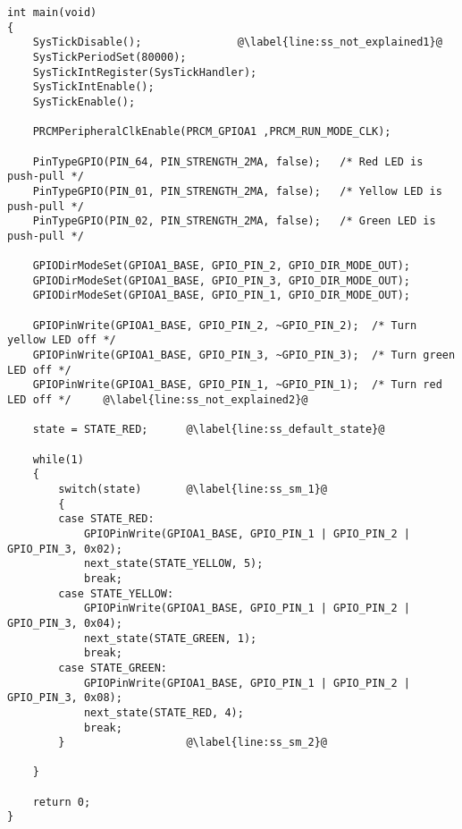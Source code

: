 \begin{lstlisting}[style=CStyle, caption={Second part of the static scheduler}, captionpos=b, label={lst:static_scheduler_2}, escapechar=@]
int main(void)
{
    SysTickDisable();               @\label{line:ss_not_explained1}@
    SysTickPeriodSet(80000);
    SysTickIntRegister(SysTickHandler);
    SysTickIntEnable();
    SysTickEnable();

    PRCMPeripheralClkEnable(PRCM_GPIOA1 ,PRCM_RUN_MODE_CLK);

    PinTypeGPIO(PIN_64, PIN_STRENGTH_2MA, false);   /* Red LED is push-pull */
    PinTypeGPIO(PIN_01, PIN_STRENGTH_2MA, false);   /* Yellow LED is push-pull */
    PinTypeGPIO(PIN_02, PIN_STRENGTH_2MA, false);   /* Green LED is push-pull */

    GPIODirModeSet(GPIOA1_BASE, GPIO_PIN_2, GPIO_DIR_MODE_OUT);
    GPIODirModeSet(GPIOA1_BASE, GPIO_PIN_3, GPIO_DIR_MODE_OUT);
    GPIODirModeSet(GPIOA1_BASE, GPIO_PIN_1, GPIO_DIR_MODE_OUT);

    GPIOPinWrite(GPIOA1_BASE, GPIO_PIN_2, ~GPIO_PIN_2);  /* Turn yellow LED off */
    GPIOPinWrite(GPIOA1_BASE, GPIO_PIN_3, ~GPIO_PIN_3);  /* Turn green LED off */
    GPIOPinWrite(GPIOA1_BASE, GPIO_PIN_1, ~GPIO_PIN_1);  /* Turn red LED off */     @\label{line:ss_not_explained2}@

    state = STATE_RED;      @\label{line:ss_default_state}@

    while(1)
    {
        switch(state)       @\label{line:ss_sm_1}@
        {
        case STATE_RED:
            GPIOPinWrite(GPIOA1_BASE, GPIO_PIN_1 | GPIO_PIN_2 | GPIO_PIN_3, 0x02);
            next_state(STATE_YELLOW, 5);
            break;
        case STATE_YELLOW:
            GPIOPinWrite(GPIOA1_BASE, GPIO_PIN_1 | GPIO_PIN_2 | GPIO_PIN_3, 0x04);
            next_state(STATE_GREEN, 1);
            break;
        case STATE_GREEN:
            GPIOPinWrite(GPIOA1_BASE, GPIO_PIN_1 | GPIO_PIN_2 | GPIO_PIN_3, 0x08);
            next_state(STATE_RED, 4);
            break;
        }                   @\label{line:ss_sm_2}@

    }

    return 0;
}
\end{lstlisting}

